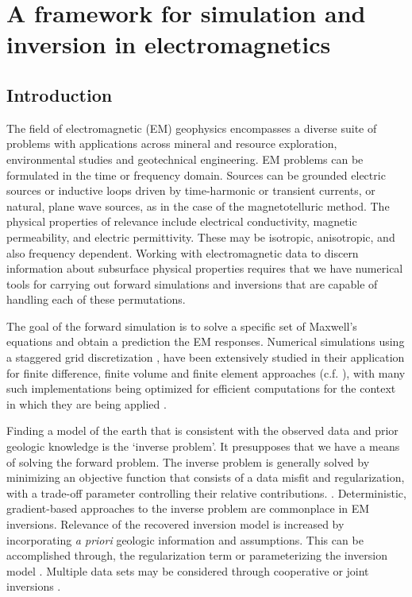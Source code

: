 
\chapter{A framework for simulation and inversion in electromagnetics}
\label{app:simpegem}

\section{Introduction}
\label{sec:intro}

The field of electromagnetic (EM) geophysics encompasses a diverse suite of
problems with applications across mineral and resource exploration,
environmental studies and geotechnical engineering. EM problems can be
formulated in the time or frequency domain. Sources can be grounded electric
sources or inductive loops driven by time-harmonic or transient currents, or
natural, plane wave sources, as in the case of the magnetotelluric method. The
physical properties of relevance include electrical conductivity, magnetic
permeability, and electric permittivity. These may be  isotropic, anisotropic,
and also frequency dependent. Working with electromagnetic data to discern
information about subsurface physical properties requires that we have
numerical tools for carrying out forward simulations and inversions that are
capable of handling each of these permutations.


The goal of the forward simulation is to solve a specific set of Maxwell's
equations and obtain a prediction the EM responses. Numerical simulations
using a staggered grid discretization \citep{Yee1966}, have been extensively
studied in their application for finite difference, finite volume and finite
element approaches (c.f. \cite{newman1999, Haber2014a}), with many such
implementations being optimized for efficient computations for the context in
which they are being applied \citep{Haber2001, Key2007,  Kelbert2014,
Yang2014}.


Finding a model of the earth that is consistent with the observed data and
prior geologic knowledge is the `inverse problem'. It presupposes
that we have a means of solving the forward problem. The inverse problem is
generally solved by minimizing an  objective function that consists of a data
misfit and regularization, with a trade-off parameter controlling their
relative contributions. \citep{Tikhonov1977, Parker1980, Constable1987}.
Deterministic, gradient-based approaches to the inverse problem are
commonplace in EM inversions.   Relevance of the recovered inversion model is
increased by incorporating \emph{a priori} geologic information and
assumptions. This can be accomplished through, the regularization term
\citep{Oldenburg2005, Constable1987} or parameterizing the inversion model
\citep{Pidlisecky2011, McMillan2015a, Kang2015}. Multiple data sets may be
considered through cooperative or joint inversions \citep{Haber1998,
McMillan2015}.

